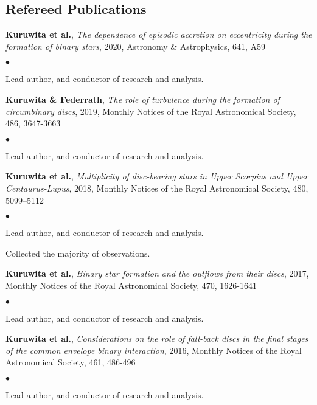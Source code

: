 \documentclass[margin,line]{res}
\newenvironment{list1}{
	\begin{list}{\ding{113}}{%
			\setlength{\itemsep}{0in}
			\setlength{\parsep}{0in} \setlength{\parskip}{0in}
			\setlength{\topsep}{0in} \setlength{\partopsep}{0in} 
			\setlength{\leftmargin}{0.17in}}}{\end{list}}
\newenvironment{list2}{
	\begin{list}{$\bullet$}{%
			\setlength{\itemsep}{0in}
			\setlength{\parsep}{0in} \setlength{\parskip}{0in}
			\setlength{\topsep}{0in} \setlength{\partopsep}{0in} 
			\setlength{\leftmargin}{0.2in}}}{\end{list}}
\begin{document}
\begin{resume}
\section{\sc Refereed Publications}
\begin{list1}
	\item[]{\bf Kuruwita et al.}, \emph{The dependence of episodic accretion on eccentricity during the formation of binary stars}, 2020, Astronomy \& Astrophysics, 641, A59
	\begin{list2}
		\item Lead author, and conductor of research and analysis.\\
	\end{list2}
	\item[] {\bf Kuruwita \& Federrath}, \emph{The role of turbulence during the formation of circumbinary discs}, 2019, Monthly Notices of the Royal Astronomical Society, 486, 3647-3663
	\begin{list2}
		\item Lead author, and conductor of research and analysis.\\
	\end{list2}
	\item[] {\bf Kuruwita et al.}, \emph{Multiplicity of disc-bearing stars in Upper Scorpius and Upper Centaurus-Lupus}, 2018, Monthly Notices of the Royal Astronomical Society, 480, 5099–5112
	\begin{list2}
		\item Lead author, and conductor of research and analysis.
		\item Collected the majority of observations.\\
	\end{list2}
	\item[] {\bf Kuruwita et al.}, \emph{Binary star formation and the outflows from their discs}, 2017, Monthly Notices of the Royal Astronomical Society, 470, 1626-1641
	\begin{list2}
		\item Lead author, and conductor of research and analysis.\\
	\end{list2}
	\item[] {\bf Kuruwita et al.}, \emph{Considerations on the role of fall-back discs in the final stages of the common envelope binary interaction}, 2016, Monthly Notices of the Royal Astronomical Society, 461, 486-496
	\begin{list2}
		\item Lead author, and conductor of research and analysis.\\

\end{list2}
\end{list1}
\end{resume}
\end{document}
